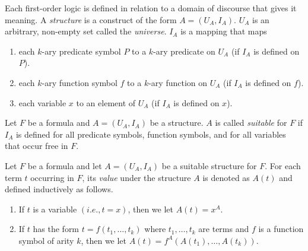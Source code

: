 Each first-order logic is defined in relation to a domain of discourse that gives it meaning.
A \textit{structure} is a construct of the form $A = (U_A, I_A)$. $U_A$ is an arbitrary, non-empty set called the \textit{universe}. $I_A$ is a mapping that maps

\begin{enumerate}
    \item each $k$-ary predicate symbol $P$ to a $k$-ary predicate on $U_A$ (if $I_A$ is defined on $P$).
    \item each $k$-ary function symbol $f$ to a $k$-ary function on $U_A$ (if $I_A$ is defined on $f$).
    \item each variable $x$ to an element of $U_A$ (if $I_A$ is defined on $x$).
\end{enumerate}

Let $F$ be a formula and $A = (U_A, I_A)$ be a structure.
$A$ is called \textit{suitable} for $F$ if $I_A$ is defined for all predicate symbols, function symbols, and for all variables that occur free in $F$.

Let $F$ be a formula and let $A = (U_A, I_A)$ be a suitable structure for $F$.
For each term $t$ occurring in $F$, its \textit{value} under the structure $A$ is denoted as $A(t)$ and defined inductively as follows.

\begin{enumerate}
    \item If $t$ is a variable $(i.e., t = x)$, then we let $A(t) = x^A$.
    \item If $t$ has the form $t = f(t_1, \ldots, t_k)$ where $t_1, \ldots, t_k$ are terms and $f$ is a function symbol of arity $k$, then we let $A(t) = f^A(A(t_1),\ldots , A(t_k))$.
\end{enumerate}


